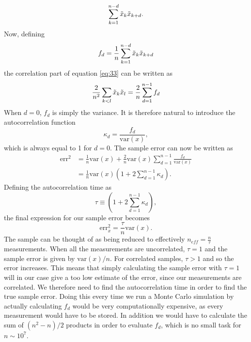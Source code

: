 \documentclass[
    a4paper, aps, twocolumn, floatfix, superscriptaddress,
    nofootinbib]{revtex4-1}
\begin{document}
\begin{equation}
     \sum_{k=1}^{n-d}\Tilde{x}_k \Tilde{x}_{k+d}.
\end{equation}
Now, defining 
\begin{equation}
    f_d = \frac{1}{n} \sum_{k=1}^{n-d} \Tilde{x}_k \Tilde{x}_{k+d}
\end{equation}
the correlation part of equation \eqref{eq:33} can be written as 
\begin{equation}
 \frac{2}{n^2} \sum_{k<l} \Tilde{x}_k \Tilde{x}_l = \frac{2}{n} \sum_{d=1}^{n-1} f_d   
\end{equation}
When $d=0$, $f_d$ is simply the variance. It is therefore natural to introduce the autocorrelation function
\begin{equation}
\kappa_d = \frac{f_d}{\text{var}(x)},
\end{equation}
which is always equal to 1 for $d=0$. The sample error can now be written as 
\begin{align}
    \text{err}^2 &= \frac{1}{n}\text{var}(x) + \frac{2}{n} \text{var}(x) \sum_{d=1}^{n-1} \frac{f_d}{\text{var}(x)}\\ 
    & = \frac{1}{n} \text{var}(x) \left( 1 + 2\sum_{d=1}^{n-1} \kappa_d \right).
\end{align}
Defining the autocorrelation time as 
\begin{equation}
\tau \equiv \left( 1 + 2\sum_{d=1}^{n-1} \kappa_d \right),
\end{equation}
the final expression for our sample error becomes 
\begin{equation}\label{eq:43}
    \text{err}_{\overline{x}}^2 = \frac{\tau}{n}\text{var}(x).
\end{equation}
The sample can be thought of as being reduced to effectively $n_{eff} = \frac{n}{\tau}$ measurements. 
When all the measurements are uncorrelated, $\tau = 1$ and the sample error is given by $\text{var}(x)/n$. For correlated samples, $\tau>1$ and so the error increases. This means that simply calculating the sample error with $\tau=1$ will in our case give a too low estimate of the error, since our measurements are correlated. We therefore need to find the autocorrelation time in order to find the true sample error. Doing this every time we run a Monte Carlo simulation by actually calculating $f_d$ would be very computationally expensive, as every measurement would have to be stored. In addition we would have to calculate the sum of $(n^2-n)/2$ products in order to evaluate $f_d$, which is no small task for $n \sim 10^7 $. 
\end{document}
